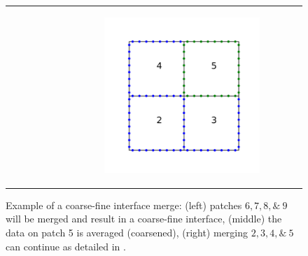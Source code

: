 \begin{figure}
\begin{tabular}{ccc}
\begin{subfigure}[t]{0.3\textwidth}
        \end{subfigure}
        &
        \begin{subfigure}[t]{0.3\textwidth}
            \centering
            \includegraphics[width=\textwidth, clip=true, trim={100 150 100 150}]{../figures/adaptive_merge3.pdf}
        \end{subfigure}
    \end{tabular}
    \caption{Example of a coarse-fine interface merge: (left) patches $6, 7, 8, \&\ 9$ will be merged and result in a coarse-fine interface, (middle) the data on patch 5 is averaged (coarsened), (right) merging $2, 3, 4, \&\ 5$ can continue as detailed in .}
    \label{fig:adaptive_merge}
\end{figure}

